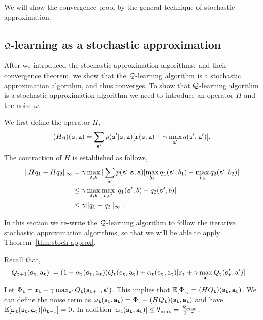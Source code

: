 We will show the convergence proof by the general technique
of stochastic approximation. 




\subsection{$\mathcal{Q}$-learning as a stochastic approximation}

After we introduced the stochastic approximation algorithms, and
their convergence theorem, we show that the $\mathcal{Q}$-learning algorithm
is a stochastic approximation algorithm, and thus converges.
%
To show that $\mathcal{Q}$-learning algorithm is a stochastic approximation
algorithm we need to introduce an operator $H$ and the noise
$\omega$.

We first define the operator $H$,
\[
(Hq)({\tt s},{\tt a})=\sum_{{\tt s}'}p({\tt s}'|{\tt s},{\tt a})
[{\tt r}({\tt s},{\tt a}) + \gamma \max_{{\tt a}'} q ({\tt s}',
{\tt a}')].
\]
The contraction of $H$ is established as follows,
\begin{align*}
\|Hq_1-Hq_2\|_\infty &= \gamma \max_{{\tt s},{\tt a}}
|\sum_{{\tt s}'} p({\tt s}'|{\tt s},{\tt a})
[\max_{b_1} q_1({\tt s}',b_1)-\max_{b_2} q_2({\tt s}',b_2)|\\
&\leq \gamma \max_{{\tt s},{\tt a}}\max_{b,{\tt s}'} |q_1({\tt s}',b)-q_2({\tt s}',b)|\\
&\leq \gamma \|q_1-q_2\|_\infty\;.
\end{align*}


In this section we re-write the $\mathcal{Q}$-learning algorithm to follow the
iterative stochastic approximation algorithms, so that we will be
able to apply Theorem~\ref{thm:stoch-approx}.

Recall that,
\begin{align*}
 Q_{{\tt t}+1}({\tt s}_{\tt t},{\tt a}_{\tt t}) & :=   (1-\alpha_{\tt t}({\tt s}_{\tt t},{\tt a}_{\tt t}) ) Q_{\tt t} ({\tt s}_{\tt t},{\tt a}_{\tt t}) + \alpha_{\tt t}({\tt s}_{\tt t},{\tt a}_{\tt t})  [{\tt r}_{\tt t} +
\gamma \max_{{\tt a}'} Q_{\tt t} ({\tt s}_{{\tt t}}',
{\tt a}')]
\end{align*}
Let $\Phi_{\tt t}={\tt r}_{\tt t} + \gamma \max_{{\tt a}'} Q_{\tt t}
({\tt s}_{{\tt t}+1}, {\tt a}')$. This implies that $\mathbb{E}[\Phi_{\tt t}]=
(HQ_{\tt t})({\tt s}_{\tt t},{\tt a}_{\tt t})$. We can define the noise
term as
$\omega_{\tt t}({\tt s}_{\tt t},{\tt a}_{\tt t})=\Phi_{\tt t}-(HQ_{\tt t})({\tt s}_{\tt t},{\tt a}_{\tt t})$
and have $\mathbb{E}[\omega_{\tt t}({\tt s}_{\tt t},{\tt a}_{\tt t})|h_{{\tt t}-1}]=0$. In
addition $|\omega_{\tt t}({\tt s}_{\tt t},{\tt a}_{\tt t})|\leq {\tt V}_{\max }=
\frac{R_{max}}{1-\gamma}$.

